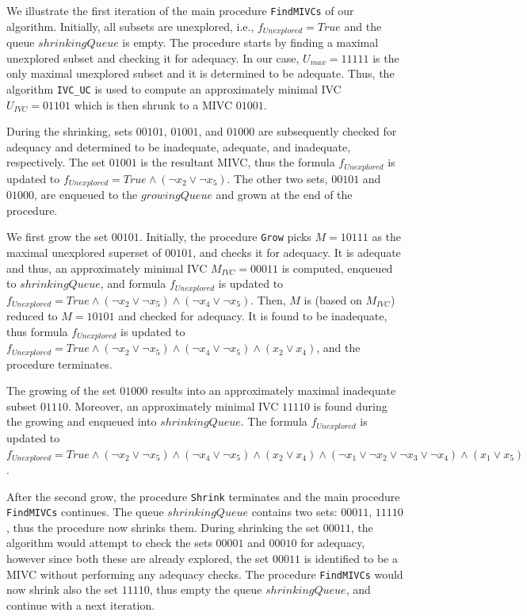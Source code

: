 We illustrate the first iteration of the main procedure \texttt{FindMIVCs} of our algorithm. Initially, all subsets are unexplored, i.e., $f_{\mathit{Unexplored}} = True$ and the queue $\mathit{shrinkingQueue}$ is empty. The procedure starts by finding a maximal unexplored subset and checking it for adequacy. In our case, $U_{\mathit{max}} = 11111$ is the only maximal unexplored subset and it is determined to be adequate. Thus, the algorithm \texttt{IVC\_UC} is used to compute an approximately minimal IVC $U_{\mathit{IVC}} = 01101$ which is then shrunk to a MIVC $01001$.

During the shrinking, sets $00101$, $01001$, and $01000$ are subsequently checked for adequacy and determined to be inadequate, adequate, and inadequate, respectively. The set $01001$ is the resultant MIVC, thus the formula $f_{\mathit{Unexplored}}$ is updated to $f_{\mathit{Unexplored}} = \mathit{True} \wedge (\neg x_2 \vee \neg x_5)$. The other two sets, $00101$ and $01000$, are enqueued to the $\mathit{growingQueue}$ and
grown at the end of the procedure.

We first grow the set $00101$. Initially, the procedure \texttt{Grow} picks $M = 10111$ as the maximal unexplored superset of $00101$, and checks it for adequacy. It is adequate and thus, an approximately minimal IVC $M_{\mathit{IVC}} = 00011$ is computed, enqueued to $\mathit{shrinkingQueue}$, and formula $f_{\mathit{Unexplored}}$ is updated to $f_{\mathit{Unexplored}} = \mathit{True} \wedge (\neg x_2 \vee \neg x_5) \wedge	(\neg x_4 \vee \neg x_5)$. Then, $M$ is (based on $M_{\mathit{IVC}}$) reduced to $M = 10101$ and checked for adequacy. It is found to be inadequate, thus formula $f_{\mathit{Unexplored}}$ is updated to $f_{\mathit{Unexplored}} = \mathit{True} \wedge (\neg x_2 \vee \neg x_5) \wedge	(\neg x_4 \vee \neg x_5) \wedge (x_2 \vee x_4)$, and the procedure terminates.

The growing of the set $01000$ results into an approximately maximal inadequate subset $01110$. Moreover, an approximately minimal IVC $11110$ is found during the growing and enqueued into $\mathit{shrinkingQueue}$. The formula $f_{\mathit{Unexplored}}$ is updated to $f_{\mathit{Unexplored}} = \mathit{True} \wedge (\neg x_2 \vee \neg x_5) \wedge	(\neg x_4 \vee \neg x_5) \wedge (x_2 \vee x_4) \wedge (\neg x_1 \vee \neg x_2 \vee \neg x_3 \vee \neg x_4) \wedge (x_1 \vee x_5)$.

After the second grow, the procedure \texttt{Shrink} terminates and the main procedure \texttt{FindMIVCs} continues. The queue $\mathit{shrinkingQueue}$ contains two sets: $00011$, $11110$, thus the procedure now shrinks them. During shrinking the set $00011$, the algorithm would attempt to check the sets $00001$ and $00010$ for adequacy, however since both these are already explored, the set $00011$ is identified to be a MIVC without performing any adequacy checks. The procedure \texttt{FindMIVCs} would now shrink also the set $11110$, thus empty the queue $\mathit{shrinkingQueue}$, and continue with a next iteration.
